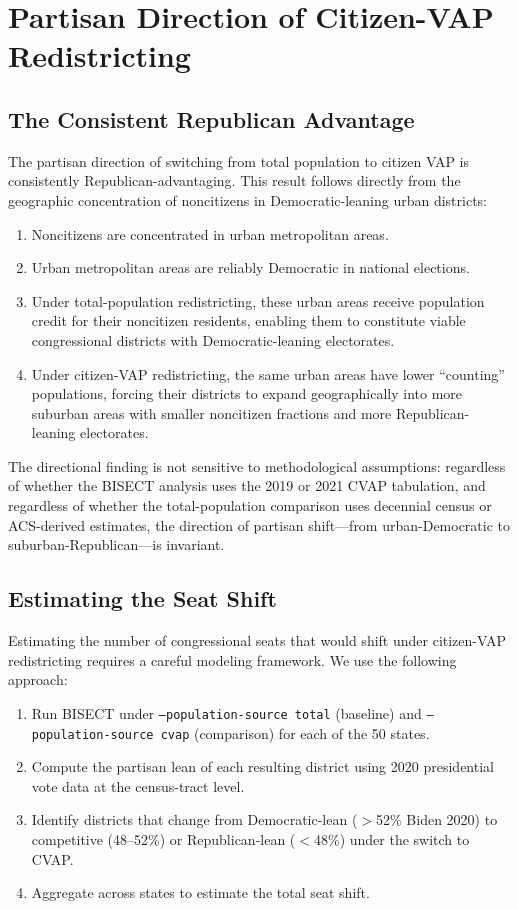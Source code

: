 \section{Partisan Direction of Citizen-VAP Redistricting}
\label{sec:partisan}

\subsection{The Consistent Republican Advantage}

The partisan direction of switching from total population to citizen VAP is consistently Republican-advantaging. This result follows directly from the geographic concentration of noncitizens in Democratic-leaning urban districts:

\begin{enumerate}
    \item Noncitizens are concentrated in urban metropolitan areas.
    \item Urban metropolitan areas are reliably Democratic in national elections.
    \item Under total-population redistricting, these urban areas receive population credit for their noncitizen residents, enabling them to constitute viable congressional districts with Democratic-leaning electorates.
    \item Under citizen-VAP redistricting, the same urban areas have lower ``counting'' populations, forcing their districts to expand geographically into more suburban areas with smaller noncitizen fractions and more Republican-leaning electorates.
\end{enumerate}

The directional finding is not sensitive to methodological assumptions: regardless of whether the BISECT analysis uses the 2019 or 2021 CVAP tabulation, and regardless of whether the total-population comparison uses decennial census or ACS-derived estimates, the direction of partisan shift---from urban-Democratic to suburban-Republican---is invariant.

\subsection{Estimating the Seat Shift}

Estimating the number of congressional seats that would shift under citizen-VAP redistricting requires a careful modeling framework. We use the following approach:

\begin{enumerate}
    \item Run BISECT under \texttt{--population-source total} (baseline) and \texttt{--population-source cvap} (comparison) for each of the 50 states.
    \item Compute the partisan lean of each resulting district using 2020 presidential vote data at the census-tract level.
    \item Identify districts that change from Democratic-lean ($>$52\% Biden 2020) to competitive (48--52\%) or Republican-lean ($<$48\%) under the switch to CVAP.
    \item Aggregate across states to estimate the total seat shift.
\end{enumerate}


